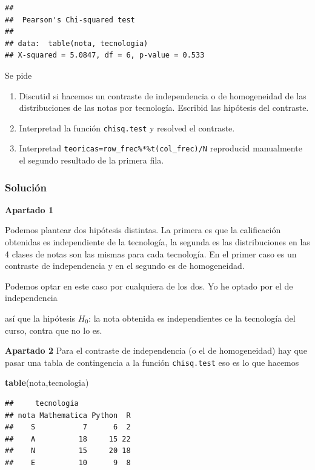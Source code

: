 \documentclass[
]{article}
\newenvironment{Shaded}{\begin{snugshade}}{\end{snugshade}}
\newcommand{\KeywordTok}[1]{\textcolor[rgb]{0.13,0.29,0.53}{\textbf{#1}}}
\newcommand{\NormalTok}[1]{#1}
\providecommand{\tightlist}{%
  \setlength{\itemsep}{0pt}\setlength{\parskip}{0pt}}
\begin{document}
\begin{verbatim}
## 
##  Pearson's Chi-squared test
## 
## data:  table(nota, tecnologia)
## X-squared = 5.0847, df = 6, p-value = 0.533
\end{verbatim}

Se pide

\begin{enumerate}
\def\labelenumi{\arabic{enumi}.}
\tightlist
\item
  Discutid si hacemos un contraste de independencia o de homogeneidad de
  las distribuciones de las notas por tecnología. Escribid las hipótesis
  del contraste.
\item
  Interpretad la función \texttt{chisq.test} y resolved el contraste.
\item
  Interpretad \texttt{teoricas=row\_frec\%*\%t(col\_frec)/N} reproducid
  manualmente el segundo resultado de la primera fila.
\end{enumerate}

\hypertarget{soluciuxf3n-3}{%
\subsubsection{Solución}\label{soluciuxf3n-3}}

\textbf{Apartado 1}

Podemos plantear dos hipótesis distintas. La primera es que la
calificación obtenidas es independiente de la tecnología, la segunda es
las distribuciones en las 4 clases de notas son las mismas para cada
tecnología. En el primer caso es un contraste de independencia y en el
segundo es de homogeneidad.

Podemos optar en este caso por cualquiera de los dos. Yo he optado por
el de independencia

así que la hipótesis \(H_0\): la nota obtenida es independientes ce la
tecnología del curso, contra que no lo es.

\textbf{Apartado 2} Para el contraste de independencia (o el de
homogeneidad) hay que pasar una tabla de contingencia a la función
\texttt{chisq.test} eso es lo que hacemos

\begin{Shaded}
\begin{Highlighting}[]
\KeywordTok{table}\NormalTok{(nota,tecnologia)}
\end{Highlighting}
\end{Shaded}

\begin{verbatim}
##     tecnologia
## nota Mathematica Python  R
##    S           7      6  2
##    A          18     15 22
##    N          15     20 18
##    E          10      9  8
\end{verbatim}
\end{document}

